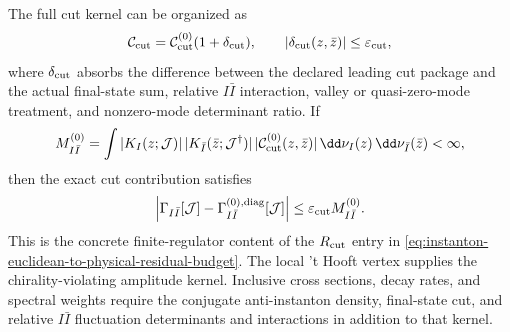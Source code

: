 \begin{controlledapproximation}
The full cut kernel can be organized as
\[
  \mathcal C_{\rm cut}
  =
  \mathcal C_{\rm cut}^{(0)}(1+\delta_{\rm cut}),
  \qquad
  |\delta_{\rm cut}(z,\bar z)|\le \varepsilon_{\rm cut},
\]
where \(\delta_{\rm cut}\) absorbs the difference between the declared leading
cut package and the actual final-state sum, relative \(I\bar I\) interaction,
valley or quasi-zero-mode treatment, and nonzero-mode determinant ratio.  If
\[
  M^{(0)}_{I\bar I}
  =
  \int
  |K_I(z;\mathcal J)|\,|K_{\bar I}(\bar z;\mathcal J^\dagger)|\,
  |\mathcal C_{\rm cut}^{(0)}(z,\bar z)|\,
  \dd\nu_I(z)\,\dd\nu_{\bar I}(\bar z)
  <\infty ,
\]
then the exact cut contribution satisfies
\begin{equation}
  \left|
  \Gamma_{I\bar I}[\mathcal J]
  -
  \Gamma^{(0),{\rm diag}}_{I\bar I}[\mathcal J]
  \right|
  \le
  \varepsilon_{\rm cut} M^{(0)}_{I\bar I}.
  \label{eq:instanton-cut-pairing-error-bound}
\end{equation}
This is the concrete finite-regulator content of the \(R_{\rm cut}\) entry in
\eqref{eq:instanton-euclidean-to-physical-residual-budget}.  The local
't Hooft vertex supplies the chirality-violating amplitude kernel.  Inclusive
cross sections, decay rates, and spectral weights require the conjugate
anti-instanton density, final-state cut, and relative \(I\bar I\)
fluctuation determinants and interactions in addition to that kernel.
\end{controlledapproximation}

